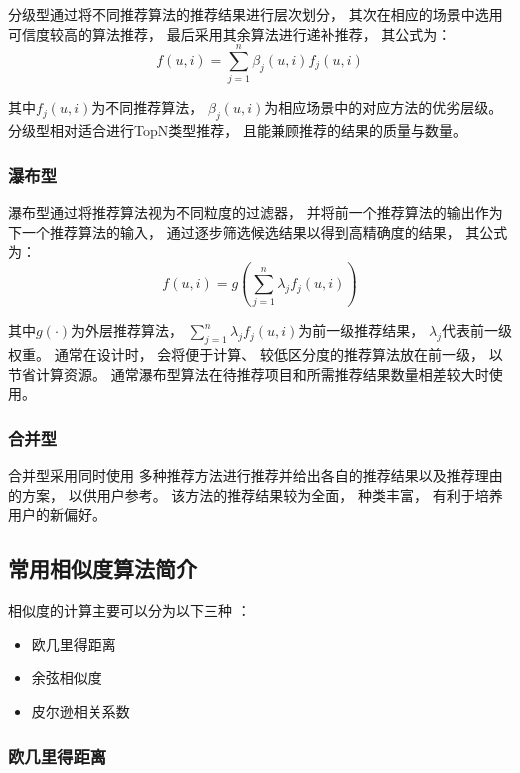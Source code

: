 分级型通过将不同推荐算法的推荐结果进行层次划分，
其次在相应的场景中选用可信度较高的算法推荐，
最后采用其余算法进行递补推荐，
其公式为：
\begin{equation}
    f(u,i)=\sum_{j=1}^n\beta_j(u,i)f_j(u,i)
\end{equation}

其中$f_j(u,i)$为不同推荐算法，
$\beta_j(u,i)$为相应场景中的对应方法的优劣层级。
分级型相对适合进行TopN类型推荐，
且能兼顾推荐的结果的质量与数量。

\subsubsection{瀑布型}

瀑布型通过将推荐算法视为不同粒度的过滤器，
并将前一个推荐算法的输出作为下一个推荐算法的输入，
通过逐步筛选候选结果以得到高精确度的结果，
其公式为：
\begin{equation}
    f(u,i)=g\left(\sum_{j=1}^n\lambda_jf_j(u,i)\right)
\end{equation}

其中$g(\cdot)$为外层推荐算法，
$\sum_{j=1}^n\lambda_jf_j(u,i)$为前一级推荐结果，
$\lambda_j$代表前一级权重。
通常在设计时，
会将便于计算、
较低区分度的推荐算法放在前一级，
以节省计算资源。
通常瀑布型算法在待推荐项目和所需推荐结果数量相差较大时使用。

\subsubsection{合并型}

合并型采用同时使用
多种推荐方法进行推荐并给出各自的推荐结果以及推荐理由
的方案，
以供用户参考。
该方法的推荐结果较为全面，
种类丰富，
有利于培养用户的新偏好。

\subsection{常用相似度算法简介}

相似度的计算主要可以分为以下三种
\cite{heJiYuJuanJiShenJingWangLuoDeYinLeTuiJianXiTong2019}：
\begin{itemize}
    \item 欧几里得距离
    \item 余弦相似度
    \item 皮尔逊相关系数
\end{itemize}

\subsubsection{欧几里得距离}

